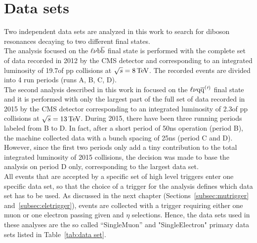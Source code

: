 
\section{Data sets}\label{sec:data set}

Two independent data sets are analyzed in this work to search for diboson resonances decaying to two different final states.\\

The analysis focused on the $\ell\nu{\mathrm{b}\overline{\mathrm{b}}}$ final state is performed with the complete set of data recorded in 2012 by the CMS detector
and corresponding to an integrated luminosity of 19.7\fbinv of pp collisions at $\sqrt{s} = 8\,\text{Te\hspace{-.08em}V}$.
The recorded events are divided into 4 run periods (runs A, B, C, D).\\

The second analysis described in this work in focused on the $\ell\nu\mathrm{q}\overline{\mathrm{q}}^({}'^){}$ final state and it is performed with only the largest part of the full set of data recorded in 2015 by the CMS detector
corresponding to an integrated luminosity of 2.3\fbinv of pp collisions at $\sqrt{s} = 13\,\text{Te\hspace{-.08em}V}$.
During 2015, there have been three running periods labeled from B to D. In fact, after a short period of 50\unit{ns} operation (period B), the machine collected data with a bunch spacing of 25\unit{ns} (period C and D).
However, since the first two periods only add a tiny contribution to the total integrated luminosity of 2015 collisions, the decision was made to base the analysis on period D only, corresponding to the largest data set.\\

All events that are accepted by a specific set of high level triggers enter one specific data set, so that the choice of a trigger for the analysis defines which data set has to be used.
As discussed in the next chapter (Sections~\ref{subsec:mutrigger} and~\ref{subsec:eletrigger}), events are collected with a trigger requiring either one muon or one electron passing given \pt and $\eta$ selections.
Hence, the data sets used in these analyses are the so called ``SingleMuon'' and "SingleElectron" primary data sets listed in Table~\ref{tab:data set}.

